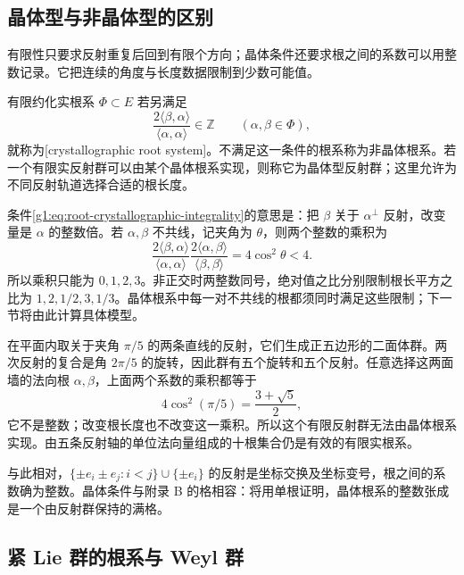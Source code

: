 \subsection{晶体型与非晶体型的区别}
\label{g1:subsec:E01:03}

有限性只要求反射重复后回到有限个方向；晶体条件还要求根之间的系数可以用整数记录。它把连续的角度与长度数据限制到少数可能值。

\begin{definition}[晶体根系]\label{g1:def:crystallographic-root-system}
	有限约化实根系 \(\Phi\subset E\) 若另满足
	\begin{equation}\label{g1:eq:root-crystallographic-integrality}
		\frac{2\langle\beta,\alpha\rangle}{\langle\alpha,\alpha\rangle}\in\mathbb Z
		\qquad(\alpha,\beta\in\Phi),
	\end{equation}
	就称为[crystallographic root system]。不满足这一条件的根系称为非晶体根系。若一个有限实反射群可以由某个晶体根系实现，则称它为晶体型反射群；这里允许为不同反射轨道选择合适的根长度。
\end{definition}

条件\eqref{g1:eq:root-crystallographic-integrality}的意思是：把 \(\beta\) 关于 \(\alpha^\perp\) 反射，改变量是 \(\alpha\) 的整数倍。若 \(\alpha,\beta\) 不共线，记夹角为 \(\theta\)，则两个整数的乘积为
\[
	\frac{2\langle\beta,\alpha\rangle}{\langle\alpha,\alpha\rangle}
	\frac{2\langle\alpha,\beta\rangle}{\langle\beta,\beta\rangle}
	=4\cos^2\theta<4.
\]
所以乘积只能为 \(0,1,2,3\)。非正交时两整数同号，绝对值之比分别限制根长平方之比为 \(1,2,1/2,3,1/3\)。晶体根系中每一对不共线的根都须同时满足这些限制；下一节将由此计算具体模型。

\begin{example}\label{g1:eg:i2-five-noncrystallographic}
	在平面内取关于夹角 \(\pi/5\) 的两条直线的反射，它们生成正五边形的二面体群。两次反射的复合是角 \(2\pi/5\) 的旋转，因此群有五个旋转和五个反射。任意选择这两面墙的法向根 \(\alpha,\beta\)，上面两个系数的乘积都等于
	\[
		4\cos^2(\pi/5)=\frac{3+\sqrt5}{2},
	\]
	它不是整数；改变根长度也不改变这一乘积。所以这个有限反射群无法由晶体根系实现。由五条反射轴的单位法向量组成的十根集合仍是有效的有限实根系。
\end{example}

与此相对，\(\{\pm e_i\pm e_j:i<j\}\cup\{\pm e_i\}\) 的反射是坐标交换及坐标变号，根之间的系数确为整数。晶体条件与附录 B 的格相容：将用单根证明，晶体根系的整数张成是一个由反射群保持的满格。

\subsection{紧 Lie 群的根系与 Weyl 群}
\label{g1:subsec:E01:04}

